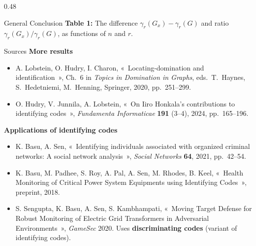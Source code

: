 \documentclass[final]{beamer}
\begin{document}
\begin{frame}[t]
\begin{columns}[t,totalwidth=\textwidth]
\begin{column}{0.48\textwidth}
\begin{block}{General Conclusion}
\vspace{0.3em}
\small
\textbf{Table 1:} The difference $\gamma_r(G_x) - \gamma_r(G)$ and ratio $\gamma_r(G_x) / \gamma_r(G)$, as functions of $n$ and $r$.
\end{block}

\begin{block}{Sources}
\textbf{More results}
\begin{itemize}
  \item A. Lobstein, O. Hudry, I. Charon, «~Locating-domination and identification~», Ch.~6 in \emph{Topics in Domination in Graphs}, eds.~T.~Haynes, S.~Hedetniemi, M.~Henning, Springer, 2020, pp.~251--299.
  \item O. Hudry, V. Junnila, A. Lobstein, «~On Iiro Honkala's contributions to identifying codes~», \emph{Fundamenta Informaticae} \textbf{191} (3--4), 2024, pp.~165--196.
\end{itemize}

\vspace{0.6em}
\textbf{Applications of identifying codes}
\begin{itemize}
  \item K. Basu, A. Sen, «~Identifying individuals associated with organized criminal networks: A social network analysis~», \emph{Social Networks} \textbf{64}, 2021, pp.~42--54.
  \item K. Basu, M. Padhee, S. Roy, A. Pal, A. Sen, M. Rhodes, B. Keel, «~Health Monitoring of Critical Power System Equipments using Identifying Codes~», preprint, 2018.
  \item S. Sengupta, K. Basu, A. Sen, S. Kambhampati, «~Moving Target Defense for Robust Monitoring of Electric Grid Transformers in Adversarial Environments~», \emph{GameSec} 2020. Uses \textbf{discriminating codes} (variant of identifying codes).
\end{itemize}
\end{block}

\end{column}

\end{columns}

\end{frame}
\end{document}
